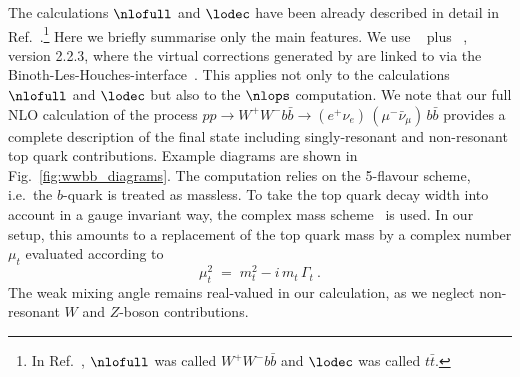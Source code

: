 The calculations $\nlofull$ and $\lodec$ have been already described
in detail in Ref.~\cite{Heinrich:2013qaa}.\footnote{%
  In Ref.~\cite{Heinrich:2013qaa}, $\nlofull$ was called
  $W^+W^- b\bar{b}$ and $\lodec$ was called $t\bar{t}$.}
Here we briefly summarise only the main features. We use
~\cite{Cullen:2011ac,Cullen:2014yla} plus
~\cite{Gleisberg:2008ta}, version 2.2.3, where the virtual
corrections generated by  are linked to  via
the Binoth-Les-Houches-interface~\cite{Binoth:2010xt,Alioli:2013nda}.
This applies not only to the calculations $\nlofull$ and $\lodec$ but
also to the $\nlops$ computation. We note that our full NLO
calculation of the process $pp\rightarrow W^+W^-b\bar b\rightarrow
(e^+ \nu_e)\,(\mu^- \bar{\nu}_{\mu})\,b\bar b$ provides a complete
description of the final state including singly-resonant and
non-resonant top quark contributions. Example diagrams are shown in
Fig.~\ref{fig:wwbb_diagrams}. The computation relies on the
5-flavour scheme, i.e.~the $b$-quark is treated as massless.
To take the top quark decay width into account in a gauge invariant
way, the complex mass scheme~\cite{Denner:2006ic} is used. In our
setup, this amounts to a replacement of the top quark mass by a
complex number $\mu_t$ evaluated according to
\begin{equation}
\mu_t^2\;=\;m_t^2-i\,m_t\,\Gamma_t~.
\label{eq:cms}
\end{equation}
The weak mixing angle remains real-valued in our calculation, as we
neglect non-resonant $W$ and $Z$-boson contributions.

